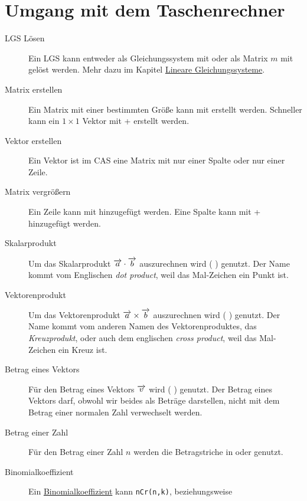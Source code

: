 \documentclass{article}
\begin{document}
\section{Umgang mit dem Taschenrechner}
\begin{description}
 \item[LGS Lösen] Ein LGS kann entweder als Gleichungssystem mit  \arrow {} \arrow {} \arrow {} oder als Matrix $m$ mit  gelöst werden. Mehr dazu im Kapitel \hyperref[Lineare Gleichungssysteme]{Lineare Gleichungssysteme}.
 \item[Matrix erstellen] Ein Matrix mit einer bestimmten Größe kann mit  \arrow {} \arrow {} \arrow {} erstellt werden. Schneller kann ein $1 \times 1$ Vektor mit  + \calckey{(} erstellt werden.
 \item[Vektor erstellen] Ein Vektor ist im CAS eine Matrix mit nur einer Spalte oder nur einer Zeile.  
 \item[Matrix vergrößern] Ein Zeile kann mit \calckey{\return} hinzugefügt werden. Eine Spalte kann mit  + \calckey{\return} hinzugefügt werden.
 \item[Skalarprodukt] Um das Skalarprodukt $\overrightarrow{a} \cdot \overrightarrow{b}$ auszurechnen wird  ( \arrow {} \arrow {} \arrow {}) genutzt. Der Name kommt vom Englischen \emph{dot product}, weil das Mal-Zeichen ein Punkt ist.
 \item[Vektorenprodukt] Um das Vektorenprodukt $\overrightarrow{a} \times \overrightarrow{b}$ auszurechnen wird  ( \arrow {} \arrow {} \arrow {}) genutzt. Der Name kommt vom anderen Namen des Vektorenproduktes, das \emph{Kreuzprodukt}, oder auch dem englischen \emph{cross product}, weil das Mal-Zeichen ein Kreuz ist.  
 \item[Betrag eines Vektors] Für den Betrag eines Vektors $\overrightarrow{v}$ wird  ( \arrow {} \arrow {} \arrow {}) genutzt. Der Betrag eines Vektors darf, obwohl wir beides als Beträge darstellen, nicht mit dem Betrag einer normalen Zahl verwechselt werden.
 \item[Betrag einer Zahl] Für den Betrag einer Zahl $n$ werden die Betragstriche in \symbols oder  genutzt. 
 \item[Binomialkoeffizient] Ein \hyperref[Binomialkoeffizient]{Binomialkoeffizient} kann \texttt{nCr(n,k)}, beziehungsweise  \arrow {} \arrow {}

\end{description}
\end{document}
